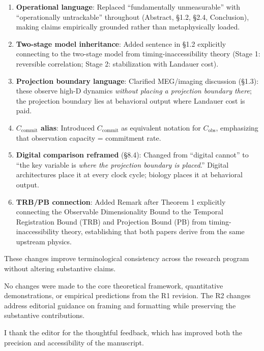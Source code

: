 \documentclass[11pt]{article}
\begin{document}
\begin{enumerate}
\item \textbf{Operational language}: Replaced ``fundamentally unmeasurable'' with ``operationally untrackable'' throughout (Abstract, \S1.2, \S2.4, Conclusion), making claims empirically grounded rather than metaphysically loaded.

\item \textbf{Two-stage model inheritance}: Added sentence in \S1.2 explicitly connecting to the two-stage model from timing-inaccessibility theory (Stage 1: reversible correlation; Stage 2: stabilization with Landauer cost).

\item \textbf{Projection boundary language}: Clarified MEG/imaging discussion (\S1.3): these observe high-D dynamics \textit{without placing a projection boundary there}; the projection boundary lies at behavioral output where Landauer cost is paid.

\item \textbf{$C_{\text{commit}}$ alias}: Introduced $C_{\text{commit}}$ as equivalent notation for $C_{\text{obs}}$, emphasizing that observation capacity = commitment rate.

\item \textbf{Digital comparison reframed} (\S8.4): Changed from ``digital cannot'' to ``the key variable is \textit{where the projection boundary is placed}.'' Digital architectures place it at every clock cycle; biology places it at behavioral output.

\item \textbf{TRB/PB connection}: Added Remark after Theorem 1 explicitly connecting the Observable Dimensionality Bound to the Temporal Registration Bound (TRB) and Projection Bound (PB) from timing-inaccessibility theory, establishing that both papers derive from the same upstream physics.
\end{enumerate}

These changes improve terminological consistency across the research program without altering substantive claims.

No changes were made to the core theoretical framework, quantitative demonstrations, or empirical predictions from the R1 revision. The R2 changes address editorial guidance on framing and formatting while preserving the substantive contributions.

I thank the editor for the thoughtful feedback, which has improved both the precision and accessibility of the manuscript.
\end{document}
